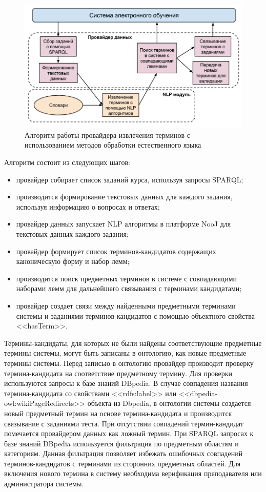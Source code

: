 \begin{figure}[ht] 
  \center
  \includegraphics[scale=0.45]{NLPAlgo}
  \caption{Алгоритм работы провайдера извлечения терминов с использованием методов обработки естественного языка} 
  \label{fig:NLPAlgo}
\end{figure}

Алгоритм состоит из следующих шагов:

\begin{itemize}
\item провайдер собирает список заданий курса, используя запросы SPARQL;
\item производится формирование текстовых данных для каждого задания, используя информацию о вопросах и ответах;
\item провайдер данных запускает NLP алгоритмы в платформе NooJ для текстовых данных каждого задания;
\item провайдер формирует список терминов-кандидатов содержащих каноническую форму и набор лемм;
\item производится поиск предметных терминов в системе с совпадающими наборами лемм для дальнейшего связывания с терминами кандидатами;
\item провайдер создает связи между найденными предметными терминами системы и заданиями терминов-кандидатов с помощью объектного свойства <<hasTerm>>.
\end{itemize}


Термины-кандидаты, для которых не были найдены соответствующие предметные термины системы, могут быть записаны в онтологию, как новые предметные термины системы. Перед записью в онтологию провайдер производит проверку термина-кандидата на соответствие предметному термину. Для проверки используются запросы к базе знаний DBpedia. В случае совпадения названия термина-кандидата со свойствами <<rdfs:label>> или <<dbpedia-owl:wikiPageRedirects>> объекта из Dbpedia, в онтологии системы создается новый предметный термин на основе термина-кандидата и производится связывание с заданиями теста. При отсутствии совпадений термин-кандидат помечается провайдером данных как ложный термин. При SPARQL запросах к базе знаний DBpedia используется фильтрация по предметным областям и категориям. Данная фильтрация позволяет избежать ошибочных совпадений терминов-кандидатов с терминами из сторонних предметных областей. Для включения нового термина в систему необходима верификация преподавателя или администратора системы. 

